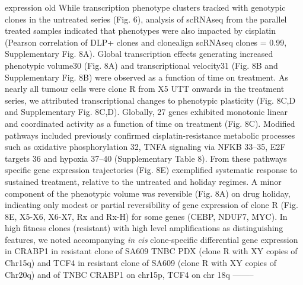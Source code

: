 \fitness expression old
While transcription phenotype clusters tracked with genotypic clones in the untreated series     (Fig. 6), analysis of scRNAseq from the parallel treated samples indicated that phenotypes were     also impacted by cisplatin (Pearson correlation of DLP+ clones and clonealign  scRNAseq      clones  =  0.99,   Supplementary  Fig.  8A).  Global  transcription  effects  generating  increased phenotypic  volume30  (Fig.  8A)  and  transcriptional  velocity31  (Fig.  8B  and  Supplementary     Fig.  8B)  were  observed  as  a  function  of  time  on  treatment.	As  nearly  all  tumour  cells      were  clone  R  from  X5  UTT   onwards  in  the  treatment  series,  we  attributed  transcriptional     changes to phenotypic plasticity (Fig. 8C,D and Supplementary Fig. 8C,D). Globally, 27 genes     exhibited monotonic linear and coordinated activity as a function of time on treatment (Fig. 8C).     Modified pathways included previously confirmed cisplatin-resistance metabolic processes such      as oxidative phosphorylation 32, TNFA signaling via NFKB 33–35, E2F targets 36 and hypoxia 37–40     (Supplementary Table 8).  From these pathways specific gene expression trajectories (Fig. 8E)     exemplified systematic response to sustained treatment, relative to the untreated and holiday      regimes. A minor component of the phenotypic volume was reversible (Fig. 8A) on drug holiday,     indicating only modest or partial reversibility of gene expression of clone R (Fig. 8E, X5-X6, X6-X7, Rx and Rx-H) for some genes (CEBP, NDUF7, MYC).
In high fitness clones (resistant) with high level amplifications as distinguishing features, we noted accompanying \textit{in cis} clone-specific differential gene expression in CRABP1 in resistant clone of SA609 TNBC PDX (clone R with XY copies of Chr15q) and  TCF4 in resistant clone of SA609 (clone R with XY copies of Chr20q) and of TNBC
CRABP1 on chr15p, TCF4 on chr 18q --------

